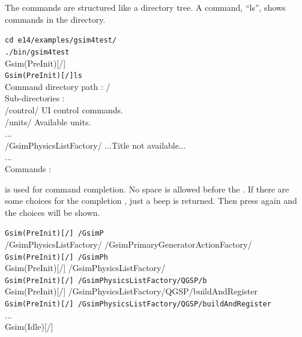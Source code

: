 \documentclass[a4paper,12pt]{article}
\begin{document}
 The commands are structured like a directory tree.
 A command, ``ls'', shows commands in the directory.
 \begin{screen}
  {\tt cd e14/examples/gsim4test/\keytop{\return}}\\
  {\tt ./bin/gsim4test\keytop{\return}}\\
  {\small Gsim(PreInit)[/]}\\
  {\tt Gsim(PreInit)[/]ls\keytop{\return}}\\
{\small Command directory path : /\\
 Sub-directories : \\
   /control/   UI control commands.\\
   /units/   Available units.\\
...\\  
   /GsimPhysicsListFactory/   ...Title not available...\\
...\\  
 Commands : }\\
 \end{screen}

  is used for command completion. No space is allowed before
  the . If there are some choices for the completion
 , just a beep is returned.
 Then press  again and the choices will be shown.
 \begin{screen}
  {\tt Gsim(PreInit)[/] /GsimP }\\
  {\small /GsimPhysicsListFactory/             /GsimPrimaryGeneratorActionFactory/}\\
  {\tt Gsim(PreInit)[/] /GsimPh}\\
  {\small Gsim(PreInit)[/] /GsimPhysicsListFactory/ }\\
  {\tt Gsim(PreInit)[/] /GsimPhysicsListFactory/QGSP/b}\\
  {\small Gsim(PreInit)[/] /GsimPhysicsListFactory/QGSP/buildAndRegister}\\
  {\tt Gsim(PreInit)[/] /GsimPhysicsListFactory/QGSP/buildAndRegister}\keytop{\return}\\
  ...\\
  {\small Gsim(Idle)[/]}\\
 \end{screen}
\end{document}
